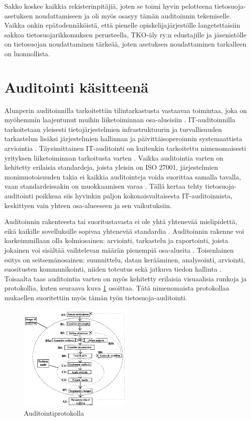 \documentclass[finnish]{tktltiki}
\begin{document}
Sakko koskee kaikkia rekisterinpitäjiä, joten se toimi hyvin pelotteena tietosuoja-asetuksen noudattamiseen ja oli myös osasyy tämän auditoinnin tekemiselle. Vaikka onkin epätodennäköistä, että pienelle opiskelijajärjestölle langetettaisiin sakkoa tietosuojarikkomuksen perusteella, TKO-äly ry:n edustajille ja jäsenistölle on tietosuojan noudattaminen tärkeää, joten asetuksen noudattaminen tarkalleen on luonnollista.

\newpage
\section{Auditointi käsitteenä}

Alunperin auditoinnilla tarkoitettiin tilintarkastusta vastaavaa toimintaa, joka on myöhemmin laajentunut muihin liiketoiminnan osa-alueisiin \cite{aditya,felley}. IT-auditoinnilla tarkoitetaan yleisesti tietojärjestelmien infrastruktuurin ja turvallisuuden tarkastelun lisäksi järjestelmien hallinnan ja päivittäisoperoinnin systemaattista arviointia \cite{felley}. Täysimittainen IT-auditointi on kuitenkin tarkoitettu nimenomaisesti yrityksen liiketoiminnan tarkoitusta varten \cite{aditya}. Vaikka auditointia varten on kehitetty erilaisia standardeja, joista yleisin on ISO 27001, järjestelmien monimuotoisuuden takia ei kaikkia auditointeja voida suorittaa samalla tavalla, vaan standardeissakin on muokkaamisen varaa \cite{dimond,felley}. Tällä kertaa tehty tietosuoja-auditointi poikkeaa siis hyvinkin paljon kokonaisvaltaisesta IT-auditoinnista, keskittyen vain yhteen osa-alueeseen ja sen vaikutuksiin. 

Auditoinnin rakenteesta tai suoritustavasta ei ole yhtä yhtenevää mielipidettä, eikä kaikille sovelluksille sopivaa yhtenevää standardia \cite{dimond,aditya,frost,felley}. Auditoinnin rakenne voi karkeimmillaan olla kolmiosainen: arviointi, tarkastelu ja raportointi, joista jokainen voi sisältää vaihtelevan määrän pienempiä osa-alueita \cite{dimond,felley}. Toisenlainen esitys on seitsemänosainen: suunnittelu, datan kerääminen, analysointi, arviointi, suositusten kommunikointi, niiden toteutus sekä jatkuva tiedon hallinta \cite{frost}. Toisaalta taas auditointia varten on myös kehitetty erilaisia visuaalisia runkoja ja protokollia, kuten seuraava kuva \ref{auditointi} osoittaa. Tätä nimenomaista protokollaa mukaellen suoritettiin myös tämän työn tietosuoja-auditointi.
\newline
\begin{figure}[H]
\includegraphics[width=0.5\textwidth]{Overview_of_audit_protocol.JPG}
\centering
\caption{Auditointiprotokolla \cite{dimond} }
\label{auditointi}
\end{figure}
\end{document}
